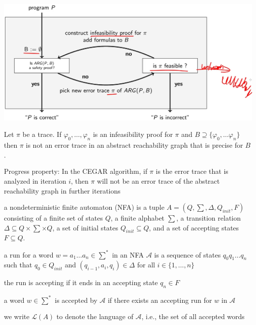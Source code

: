 \documentclass[landscape, a4paper]{article}
\begin{document}
\begin{minipage}[t]{0.2\linewidth}
\begin{betterlist}
		\includegraphics[width=0.8\linewidth]{./figures/cegar_approach.png}
		\item Let $\pi$  be a trace. If $\varphi_0,\ldots , \varphi_n$ is an infeasibility proof for $\pi$  and $B \supseteq \{ \varphi_0,\ldots \varphi_n\}$  then $\pi$  is not an error trace in an abstract reachability graph that is precise for $B$. 
		\item \alert{Progress property:} In the CEGAR algorithm, if $\pi$ is the error trace that is analyzed in iteration $i$, then $\pi$ will not be an error trace of the abstract reachability graph in further iterations
	\end{betterlist}
	\begin{betterlist}
		\item a \alert{nondeterministic finite automaton (NFA)} is a tuple $A = (Q, \sum , \Delta , Q_{init}, F)$ consisting of a finite set of states $Q$, a finite alphabet $\sum$, a transition relation $\Delta \subseteq Q × \sum  × Q$, a set of initial states $Q_{init} \subseteq Q$, and a set of accepting states $F \subseteq Q$.
		\begin{betterlist}
			\item a \alert{run} for a word $w = a_1\ldots a_n \in \sum^{*}$ in an NFA $\mathcal{A}$ is a sequence of states $q_0q_1\ldots q_n$ such that $q_0 \in Q_{init}$ and $(q_{i−1}, a_{i}, q_{i}) \in \Delta$ for all $i \in \{1,\ldots , n\}$
			\begin{betterlist}
				\item the run is \alert{accepting} if it ends in an accepting state $q_n \in F$
			\end{betterlist}
			\item a word $w \in \sum ^*$ is \alert{accepted} by $\mathcal{A}$ if there exists an accepting run for $w$ in $\mathcal{A}$
			\item we write $\mathcal{L}(A)$ to denote the \alert{language of $\mathcal{A}$}, i.e., the set of all accepted words
		\end{betterlist}

\end{betterlist}
\end{minipage}
\end{document}
